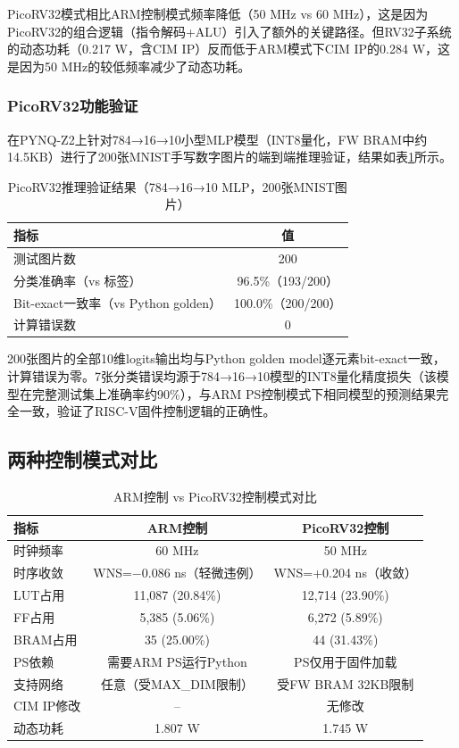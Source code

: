\documentclass[12pt, a4paper]{article}
\begin{document}
PicoRV32模式相比ARM控制模式频率降低（50 MHz vs 60 MHz），这是因为PicoRV32的组合逻辑（指令解码+ALU）引入了额外的关键路径。但RV32子系统的动态功耗（0.217 W，含CIM IP）反而低于ARM模式下CIM IP的0.284 W，这是因为50 MHz的较低频率减少了动态功耗。

\subsubsection{PicoRV32功能验证}

在PYNQ-Z2上针对784→16→10小型MLP模型（INT8量化，FW BRAM中约14.5KB）进行了200张MNIST手写数字图片的端到端推理验证，结果如表\ref{tab:rv32_verify}所示。

\begin{table}[H]
    \centering
    \caption{PicoRV32推理验证结果（784→16→10 MLP，200张MNIST图片）}
    \begin{tabular}{lc}
        \toprule
        指标 & 值 \\
        \midrule
        测试图片数 & 200 \\
        分类准确率（vs 标签） & 96.5\%（193/200） \\
        Bit-exact一致率（vs Python golden） & 100.0\%（200/200） \\
        计算错误数 & 0 \\
        \bottomrule
    \end{tabular}
    \label{tab:rv32_verify}
\end{table}

200张图片的全部10维logits输出均与Python golden model逐元素bit-exact一致，计算错误为零。7张分类错误均源于784→16→10模型的INT8量化精度损失（该模型在完整测试集上准确率约90\%），与ARM PS控制模式下相同模型的预测结果完全一致，验证了RISC-V固件控制逻辑的正确性。

\subsection{两种控制模式对比}

\begin{table}[H]
	\centering
	\caption{ARM控制 vs PicoRV32控制模式对比}
	\begin{tabular}{lcc}
		\toprule
		指标 & ARM控制 & PicoRV32控制 \\
		\midrule
		时钟频率 & 60 MHz & 50 MHz \\
		时序收敛 & WNS=$-0.086$ ns（轻微违例） & WNS=+0.204 ns（收敛） \\
		LUT占用 & 11,087 (20.84\%) & 12,714 (23.90\%) \\
		FF占用 & 5,385 (5.06\%) & 6,272 (5.89\%) \\
		BRAM占用 & 35 (25.00\%) & 44 (31.43\%) \\
		PS依赖 & 需要ARM PS运行Python & PS仅用于固件加载 \\
		支持网络 & 任意（受MAX\_DIM限制） & 受FW BRAM 32KB限制 \\
		CIM IP修改 & -- & 无修改 \\
		动态功耗 & 1.807 W & 1.745 W \\
		\bottomrule
	\end{tabular}
\end{table}
\end{document}
